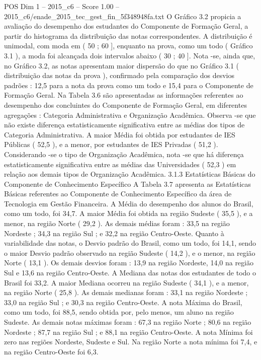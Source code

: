 \begin{textsample}{POS Dim 1 – 2015\_c6 – Score 1.00 – 2015\_c6/enade\_2015\_tec\_gest\_fin\_5f348948fa.txt}
O Gráfico 3.2 propicia a avaliação do desempenho dos estudantes do Componente de Formação Geral, a partir do histograma da distribuição das notas correspondentes.
A distribuição é unimodal, com moda em ( 50 ; 60 ], enquanto na prova, como um todo ( Gráfico 3.1 ), a moda foi alcançada dois intervalos abaixo ( 30 ; 40 ].
Nota -se, ainda que, no Gráfico 3.2, as notas apresentam maior dispersão do que no Gráfico 3.1 ( distribuição das notas da prova ), confirmado pela comparação dos desvios padrões : 12,5 para a nota da prova como um todo e 15,4 para o Componente de Formação Geral.
Na Tabela 3.6 são apresentadas as informações referentes ao desempenho dos concluintes do Componente de Formação Geral, em diferentes agregações : Categoria Administrativa e Organização Acadêmica.
Observa -se que não existe diferença estatisticamente significativa entre as médias dos tipos de Categoria Administrativa.
A maior Média foi obtida por estudantes de IES Públicas ( 52,5 ), e a menor, por estudantes de IES Privadas ( 51,2 ).
Considerando -se o tipo de Organização Acadêmica, nota -se que há diferença estatisticamente significativa entre as médias das Universidades ( 52,3 ) em relação aos demais tipos de Organização Acadêmica. 3.1.3 Estatísticas Básicas do Componente de Conhecimento Específico A Tabela 3.7 apresenta as Estatísticas Básicas referentes ao Componente de Conhecimento Específico da área de Tecnologia em Gestão Financeira.
A Média do desempenho dos alunos do Brasil, como um todo, foi 34,7.
A maior Média foi obtida na região Sudeste ( 35,5 ), e a menor, na região Norte ( 29,2 ).
As demais médias foram : 33,5 na região Nordeste ; 34,3 na região Sul ; e 32,2 na região Centro-Oeste.
Quanto à variabilidade das notas, o Desvio padrão do Brasil, como um todo, foi 14,1, sendo o maior Desvio padrão observado na região Sudeste ( 14,2 ), e o menor, na região Norte ( 13,1 ).
Os demais desvios foram : 13,9 na região Nordeste, 14,0 na região Sul e 13,6 na região Centro-Oeste.
A Mediana das notas dos estudantes de todo o Brasil foi 33,2.
A maior Mediana ocorreu na região Sudeste ( 34,1 ), e a menor, na região Norte ( 25,8 ).
As demais medianas foram : 33,1 na região Nordeste ; 33,0 na região Sul ; e 30,3 na região Centro-Oeste.
A nota Máxima do Brasil, como um todo, foi 88,5, sendo obtida por, pelo menos, um aluno na região Sudeste.
As demais notas máximas foram : 67,3 na região Norte ; 80,6 na região Nordeste ; 87,7 na região Sul ; e 88,1 na região Centro-Oeste.
A nota Mínima foi zero nas regiões Nordeste, Sudeste e Sul.
Na região Norte a nota mínima foi 7,4, e na região Centro-Oeste foi 6,3.

\end{textsample}
